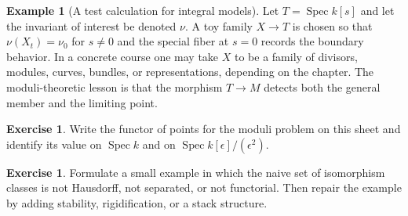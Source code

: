 \documentclass[11pt]{amsart}
\theoremstyle{definition}
\newtheorem{example}[theorem]{Example}
\newtheorem{exercise}[theorem]{Exercise}
\newcommand{\Spec}{\operatorname{Spec}}
\begin{document}
\begin{example}[A test calculation for integral models]
Let $T=\Spec k[s]$ and let the invariant of interest be denoted $\nu$.  A toy family $X\to T$ is chosen so that $\nu(X_t)=\nu_0$ for $s\ne0$ and the special fiber at $s=0$ records the boundary behavior.  In a concrete course one may take $X$ to be a family of divisors, modules, curves, bundles, or representations, depending on the chapter.  The moduli-theoretic lesson is that the morphism $T\to M$ detects both the general member and the limiting point.
\end{example}
\begin{exercise}
Write the functor of points for the moduli problem on this sheet and identify its value on $\Spec k$ and on $\Spec k[\epsilon]/(\epsilon^2)$.
\end{exercise}
\begin{exercise}
Formulate a small example in which the naive set of isomorphism classes is not Hausdorff, not separated, or not functorial.  Then repair the example by adding stability, rigidification, or a stack structure.
\end{exercise}
\clearpage
\end{document}
